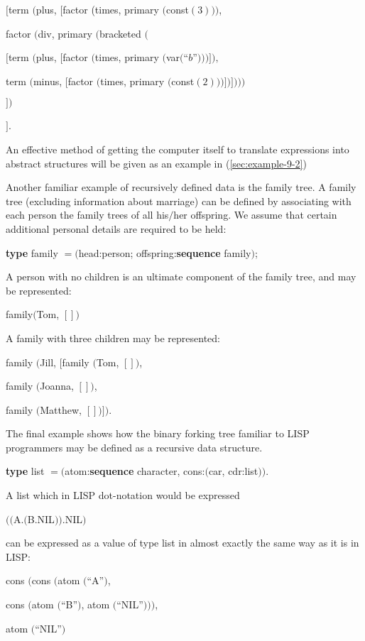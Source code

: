 \quad $[$term $($plus, $[$factor (times, primary $($const$(3)))$,

\tabto*{7.75em} factor $($div, primary $($bracketed $($

\tabto*{9em}  $[$term $($plus, $[$factor $($times, primary $($var$($``$b$''$)))]),$

\tabto*{9.1em}  term $($minus, $[$factor $($times, primary $($const$(2)))])])))$

\tabto*{7.55em}  $])$

\quad $]$.

\noindent
An effective method of getting the computer itself to translate expressions into abstract structures will be given as an example in (\ref{sec:example-9-2})

Another familiar example of recursively defined data is the family tree. A family tree (excluding information about marriage) can be defined by associating with each person the family trees of all his$/$her offspring. We assume that certain additional personal details are required to be held: 

\quad \textbf{type} family $= ($head:person; offspring:\textbf{sequence} family$)$;

A person with no children is an ultimate component of the family tree, and may be represented:

\quad family$($Tom, $[])$

\noindent
A family with three children may be represented:

\noindent
family $($Jill, $[$family $($Tom, $[])$,

\tabto{3.2em} family $($Joanna, $[])$,

\tabto{3.2em} family $($Matthew, $[])])$.

The final example shows how the binary forking tree familiar to LISP programmers may be defined as a recursive data structure.

\quad \textbf{type} list $= ($atom:\textbf{sequence} character, cons:$($car, cdr:list$))$.

\noindent
A list which in LISP dot-notation would be expressed

\quad $(($A.$($B.NIL$))$.NIL$)$

\noindent
can be expressed as a value of type list in almost exactly the same way as it is in LISP:

\quad cons $($cons $($atom $($``A''$)$,

\tabto{5em} cons $($atom $($``B''$)$, atom $($``NIL''$)))$,

\tabto{5em} atom $($``NIL''$)$

